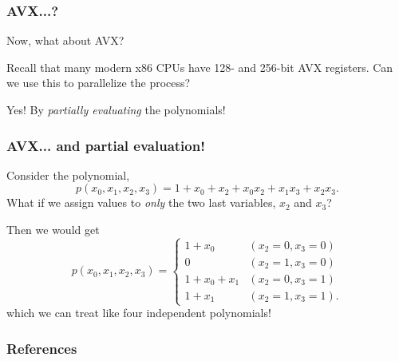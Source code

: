 \documentclass{beamer}
\begin{document}
    \begin{frame}
        \frametitle{AVX...?}
        Now, what about AVX? 
        
        \pause

        Recall that many modern x86 CPUs have 128- and 256-bit AVX registers. Can we use this to parallelize the process?

        \pause

        Yes! By \textit{partially evaluating} the polynomials!
    \end{frame}

    \begin{frame}
        \frametitle{AVX... and partial evaluation!}
        Consider the polynomial,
        $$
            p(x_0, x_1, x_2, x_3) = 1 + x_0 + x_2 + x_0x_2 + x_1x_3 + x_2x_3.
        $$
        What if we assign values to \textit{only} the two last variables, $x_2$ and $x_3$? 

        \pause 

        Then we would get
        \begin{equation*}
            p(x_0,x_1,x_2,x_3) = 
            \begin{cases}
                1 + x_0       & (x_2 = 0, x_3 = 0)\\
                0             & (x_2 = 1, x_3 = 0)\\
                1 + x_0 + x_1 & (x_2 = 0, x_3 = 1)\\
                1 + x_1       & (x_2 = 1, x_3 = 1).
            \end{cases}
        \end{equation*} 
        which we can treat like four independent polynomials!
        
    \end{frame}

\begin{frame}
    \frametitle{References}
    \printbibliography
\end{frame}
\end{document}
